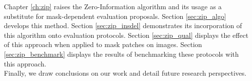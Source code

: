 \noindent Chapter \ref{ch:zip} raises the Zero-Information algorithm and its usage as a substitute
for mask-dependent evaluation proposals. Section \ref{sec:zip_algo} develops this 
method. Section \ref{sec:zip_insdel} demonstrates its incorporation of this 
algorithm onto evaluation protocols. Section \ref{sec:zip_qual} displays
the effect of this approach when applied to mask patches on images. Section 
\ref{sec:zip_benchmark} displays the results of benchmarking these protocols 
with this approach. \\
    
\noindent Finally, we draw conclusions on our work and detail future research perspectives.